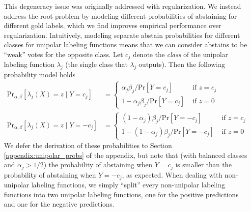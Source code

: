 
This degeneracy issue was originally addressed with regularization. We instead address the root problem by modeling different probabilities of abstaining for different gold labels, which we find improves empirical performance over regularization. Intuitively, modeling separate abstain probabilities for different classes for unipolar labeling functions means that we can consider abstains to be ``weak'' votes for the opposite class. Let $c_j$ denote the \textit{class} of the unipolar labeling function $\lambda_j$ (the single class that $\lambda_j$ outputs). Then the following probability model holds
\begin{align}
    \text{Pr}_{\alpha,\beta}[\lambda_j(X)=z\mid Y=c_j]&=\begin{cases}
        \alpha_j\beta_j/\text{Pr}[Y=c_j]&\text{ if }z=c_j\\
        1-\alpha_j\beta_j/\text{Pr}[Y=c_j]&\text{ if }z=0
    \end{cases}\\
    \text{Pr}_{\alpha,\beta}[\lambda_j(X)=z\mid Y=-c_j]&=\begin{cases}
        (1-\alpha_j)\beta_j/\text{Pr}[Y=-c_j]&\text{ if }z=c_j\\
        1-(1-\alpha_j)\beta_j/\text{Pr}[Y=-c_j]&\text{ if }z=0
    \end{cases}
\end{align}
We defer the derivation of these probabilities to Section \ref{appendix:unipolar_probs} of the appendix, but note that (with balanced classes and $\alpha_j>1/2$) the probability of abstaining when $Y=c_j$ is smaller than the probability of abstaining when $Y=-c_j$, as expected.
When dealing with non-unipolar labeling functions, we simply ``split'' every non-unipolar labeling functions into two unipolar labeling functions, one for the positive predictions and one for the negative predictions.


